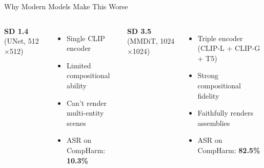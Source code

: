 \documentclass[aspectratio=169,12pt]{beamer}
\begin{document}
\begin{frame}{Why Modern Models Make This Worse}

\begin{columns}[T]
\textbf{SD 1.4} (UNet, 512$\times$512)
\begin{itemize}
\item Single CLIP encoder
\item Limited compositional ability
\item Can't render multi-entity scenes
\item ASR on CompHarm: \textcolor{safegreen}{\textbf{10.3\%}}
\end{itemize}

\textbf{SD 3.5} (MMDiT, 1024$\times$1024)
\begin{itemize}
\item Triple encoder (CLIP-L + CLIP-G + T5)
\item Strong compositional fidelity
\item Faithfully renders assemblies
\item ASR on CompHarm: \textcolor{dangerred}{\textbf{82.5\%}}
\end{itemize}
\end{columns}

\vspace{12pt}

\begin{center}
\end{center}

\end{frame}
\end{document}
